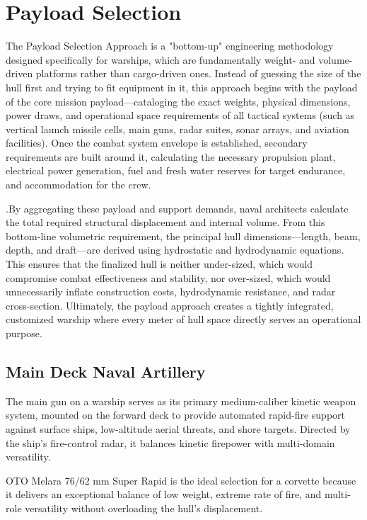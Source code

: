 \documentclass[12pt,a4paper,twoside]{report}
\begin{document}
    \section{Payload Selection}
    The Payload Selection Approach is a "bottom-up" engineering methodology designed specifically for warships, which are fundamentally weight- and volume-driven platforms rather than cargo-driven ones. Instead of guessing the size of the hull first and trying to fit equipment in it, this approach begins with the payload of the core mission payload—cataloging the exact weights, physical dimensions, power draws, and operational space requirements of all tactical systems (such as vertical launch missile cells, main guns, radar suites, sonar arrays, and aviation facilities). Once the combat system envelope is established, secondary requirements are built around it, calculating the necessary propulsion plant, electrical power generation, fuel and fresh water reserves for target endurance, and accommodation for the crew. \vspace{\baselineskip} \par.\noindent By aggregating these payload and support demands, naval architects calculate the total required structural displacement and internal volume. From this bottom-line volumetric requirement, the principal hull dimensions—length, beam, depth, and draft—are derived using hydrostatic and hydrodynamic equations. This ensures that the finalized hull is neither under-sized, which would compromise combat effectiveness and stability, nor over-sized, which would unnecessarily inflate construction costs, hydrodynamic resistance, and radar cross-section. Ultimately, the payload approach creates a tightly integrated, customized warship where every meter of hull space directly serves an operational purpose.
    \subsection{Main Deck Naval Artillery}The main gun on a warship serves as its primary medium-caliber kinetic weapon system, mounted on the forward deck to provide automated rapid-fire support against surface ships, low-altitude aerial threats, and shore targets. Directed by the ship's fire-control radar, it balances kinetic firepower with multi-domain versatility.
    \vspace{\baselineskip}\par\noindent
    OTO Melara 76/62 mm Super Rapid is the ideal selection for a corvette because it delivers an exceptional balance of low weight, extreme rate of fire, and multi-role versatility without overloading the hull's displacement. 
    
\end{document}
